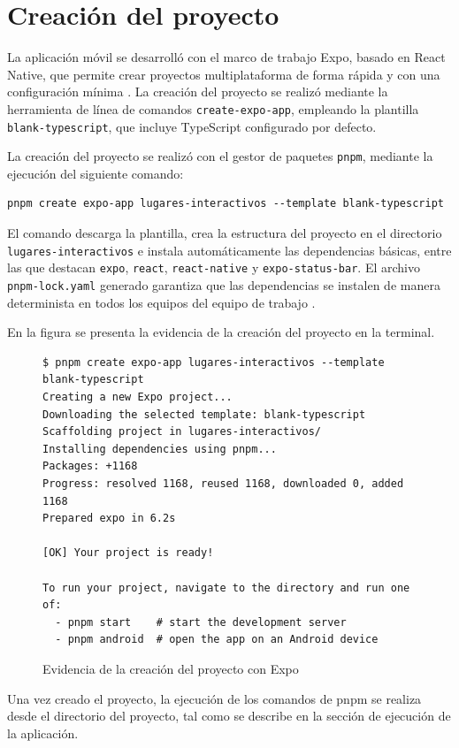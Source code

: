 
\section{Creaci\'on del proyecto}

La aplicaci\'on m\'ovil se desarroll\'o con el marco de trabajo Expo, basado en
React Native, que permite crear proyectos multiplataforma de forma r\'apida y
con una configuraci\'on m\'inima \citep{expo}. La creaci\'on del proyecto se
realiz\'o mediante la herramienta de l\'inea de comandos \texttt{create-expo-app},
empleando la plantilla \texttt{blank-typescript}, que incluye TypeScript
configurado por defecto.

La creaci\'on del proyecto se realiz\'o con el gestor de paquetes
\texttt{pnpm}, mediante la ejecuci\'on del siguiente comando:

\begin{lstlisting}
pnpm create expo-app lugares-interactivos --template blank-typescript
\end{lstlisting}

El comando descarga la plantilla, crea la estructura del proyecto en el
directorio \texttt{lugares-interactivos} e instala autom\'aticamente las
dependencias b\'asicas, entre las que destacan \texttt{expo},
\texttt{react}, \texttt{react-native} y \texttt{expo-status-bar}. El archivo
\texttt{pnpm-lock.yaml} generado garantiza que las dependencias se instalen de
manera determinista en todos los equipos del equipo de trabajo
\citep{nodejs}.

En la figura se presenta la evidencia de la creaci\'on del proyecto en la
terminal.

\begin{figure}[H]
\centering
  \caption{Evidencia de la creaci\'on del proyecto con Expo}
  \label{fig:creacion-proyecto}
  \vspace{6pt}
  \begin{lstlisting}[style=terminal]
$ pnpm create expo-app lugares-interactivos --template blank-typescript
Creating a new Expo project...
Downloading the selected template: blank-typescript
Scaffolding project in lugares-interactivos/
Installing dependencies using pnpm...
Packages: +1168
Progress: resolved 1168, reused 1168, downloaded 0, added 1168
Prepared expo in 6.2s

[OK] Your project is ready!

To run your project, navigate to the directory and run one of:
  - pnpm start    # start the development server
  - pnpm android  # open the app on an Android device
  \end{lstlisting}
  \par\raggedright{}\end{figure}

Una vez creado el proyecto, la ejecuci\'on de los comandos de pnpm se realiza
desde el directorio del proyecto, tal como se describe en la secci\'on de
ejecuci\'on de la aplicaci\'on.

